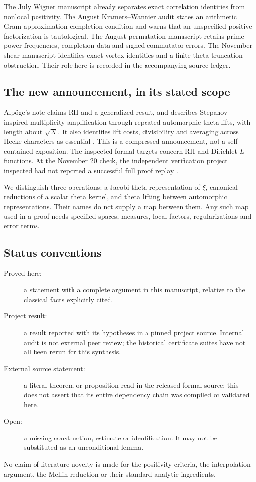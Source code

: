 \documentclass[11pt,letterpaper]{article}
\theoremstyle{definition}
\theoremstyle{remark}
\numberwithin{equation}{section}
\begin{document}
The July Wigner manuscript already separates exact correlation identities from nonlocal positivity. The August Kramers--Wannier audit states an arithmetic Gram-approximation completion condition and warns that an unspecified positive factorization is tautological. The August permutation manuscript retains prime-power frequencies, completion data and signed commutator errors. The November shear manuscript identifies exact vortex identities and a finite-theta-truncation obstruction. Their role here is recorded in the accompanying source ledger.

\subsection{The new announcement, in its stated scope}
Alp\"oge's note claims RH and a generalized result, and describes Stepanov-inspired multiplicity amplification through repeated automorphic theta lifts, with length about $\sqrt X$. It also identifies lift costs, divisibility and averaging across Hecke characters as essential \cite{alpoge}. This is a compressed announcement, not a self-contained exposition. The inspected formal targets concern RH and Dirichlet $L$-functions. At the November 20 check, the independent verification project inspected had not reported a successful full proof replay \cite{externalcheck}.

We distinguish three operations: a Jacobi theta representation of $\xi$, canonical reductions of a scalar theta kernel, and theta lifting between automorphic representations. Their names do not supply a map between them. Any such map used in a proof needs specified spaces, measures, local factors, regularizations and error terms.

\subsection{Status conventions}
\begin{description}
\item[Proved here:] a statement with a complete argument in this manuscript, relative to the classical facts explicitly cited.
\item[Project result:] a result reported with its hypotheses in a pinned project source. Internal audit is not external peer review; the historical certificate suites have not all been rerun for this synthesis.
\item[External source statement:] a literal theorem or proposition read in the released formal source; this does not assert that its entire dependency chain was compiled or validated here.
\item[Open:] a missing construction, estimate or identification. It may not be substituted as an unconditional lemma.
\end{description}
No claim of literature novelty is made for the positivity criteria, the interpolation argument, the Mellin reduction or their standard analytic ingredients.
\end{document}
